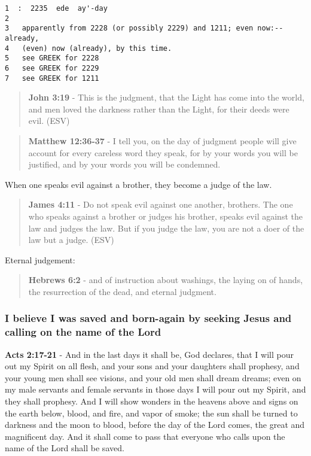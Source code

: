 \documentclass[11pt]{article}
\begin{document}
\begin{verbatim}
1  :  2235  ede  ay'-day
2  
3   apparently from 2228 (or possibly 2229) and 1211; even now:--already,
4   (even) now (already), by this time.
5   see GREEK for 2228
6   see GREEK for 2229
7   see GREEK for 1211
\end{verbatim}

\begin{quote}
\textbf{John 3:19} - This is the judgment, that the Light has come into the world, and men loved the darkness rather than the Light, for their deeds were evil. (ESV)
\end{quote}

\begin{quote}
\textbf{Matthew 12:36-37} - I tell you, on the day of judgment people will give account for every careless word they speak, for by your words you will be justified, and by your words you will be condemned.
\end{quote}

When one speaks evil against a brother, they become a judge of the law.

\begin{quote}
\textbf{James 4:11} - Do not speak evil against one another, brothers. The one who speaks against a brother or judges his brother, speaks evil against the law and judges the law. But if you judge the law, you are not a doer of the law but a judge. (ESV)
\end{quote}

Eternal judgement:

\begin{quote}
\textbf{Hebrews 6:2} - and of instruction about washings, the laying on of hands, the resurrection of the dead, and eternal judgment.
\end{quote}

\subsubsection{I believe I was saved and born-again by seeking Jesus and calling on the name of the Lord}
\label{sec:org38b3060}

\textbf{Acts 2:17-21} - And in the last days it shall be, God declares, that I will pour out my Spirit on all flesh, and your sons and your daughters shall prophesy, and your young men shall see visions, and your old men shall dream dreams; even on my male servants and female servants in those days I will pour out my Spirit, and they shall prophesy. And I will show wonders in the heavens above and signs on the earth below, blood, and fire, and vapor of smoke; the sun shall be turned to darkness and the moon to blood, before the day of the Lord comes, the great and magnificent day. And it shall come to pass that everyone who calls upon the name of the Lord shall be saved.
\end{document}
